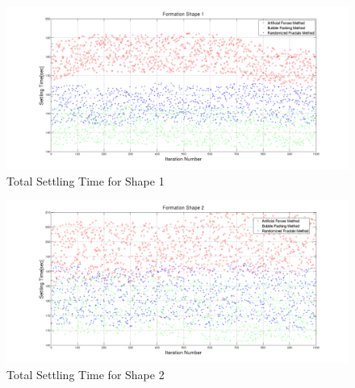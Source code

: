 \begin{figure}[H]
\caption{Total Settling Time for Shape 1} \label{settling_1}
\centerline{\includegraphics[scale = 0.32]{Total_Time_Shape_1}}
\end{figure} 
		
\begin{figure}[H]
\caption{Total Settling Time for Shape 2} \label{settling_2}
\centerline{\includegraphics[scale = 0.32]{Total_Time_Shape_2}}
\end{figure} 

